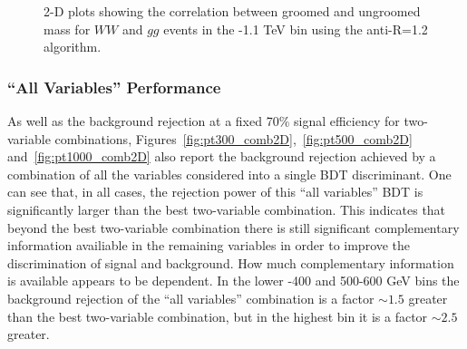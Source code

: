 \begin{figure}
\centering
{}
\caption{2-D plots showing the correlation between groomed and
  ungroomed mass for $WW$ and $gg$ events in the -1.1 TeV bin using the
  anti-\kT R=1.2 algorithm.}
\label{fig:pt1000_2d_masses_AKt_R12}
\end{figure}

\subsubsection{``All Variables'' Performance}\label{sec:Wtagallvars}

As well as the background rejection at a fixed 70\% signal efficiency
for two-variable combinations, Figures~\ref{fig:pt300_comb2D},~\ref{fig:pt500_comb2D}
and~\ref{fig:pt1000_comb2D} also report the background rejection
achieved by a combination of all the variables considered into a
single BDT discriminant. One can see that, in all cases, the rejection
power of this ``all variables'' BDT is significantly larger than the
best two-variable combination. This indicates
that beyond the best two-variable combination there is still
significant complementary information availiable in the remaining
variables in order to improve the discrimination of signal and
background. How much complementary information is available appears to
be \pt dependent. In the lower -400 and 500-600 GeV bins the
background rejection of the ``all variables'' combination is a factor
$\sim 1.5$ greater than the best two-variable combination, but in the
highest \pt bin it is a factor $\sim 2.5$ greater. 

